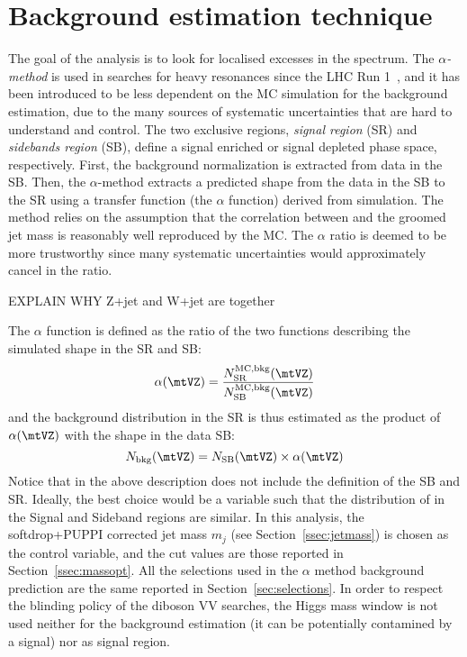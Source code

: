 \section{Background estimation technique}
\label{sec:alpha}

The goal of the analysis is to look for localised excesses in the \mtVZ spectrum. The \emph{$\alpha$-method} is used in searches for heavy resonances since the LHC Run 1~\cite{Khachatryan:2015cwa}, and it has been introduced to be less dependent on the MC simulation for the background \mtVZ estimation, due to the many sources of systematic uncertainties that are hard to understand and control. The two exclusive regions, \emph{signal region} (SR) and \emph{sidebands region} (SB), define a signal enriched or signal depleted phase space, respectively. First, the background normalization is extracted from data in the SB. Then, the $\alpha$-method extracts a predicted shape from the data in the SB to the SR using a transfer function (the $\alpha$ function) derived from simulation. The method relies on the assumption that the correlation between \mtVZ and the groomed jet mass is reasonably well reproduced by the MC. The $\alpha$ ratio is deemed to be more trustworthy since many systematic uncertainties would approximately cancel in the ratio.

{\color{red} EXPLAIN WHY Z+jet and W+jet are together}

\noindent The $\alpha$ function is defined as the ratio of the two functions describing the simulated \mtVZ shape in the SR and SB:
$$\alpha(\mtVZ) = \frac{N_{\text{SR}}^{\text{MC,bkg}}(\mtVZ)}{N_{\text{SB}}^{\text{MC,bkg}}(\mtVZ)}$$
%
and the background distribution in the SR is thus estimated as the product of  $\alpha(\mtVZ)$ with the shape in the data SB:
%
$$N_{\text{bkg}}(\mtVZ) = N_{\text{SB}}(\mtVZ) \times \alpha(\mtVZ)$$
%
Notice that in the above description does not include the definition of the SB and SR. Ideally, the best choice would be a variable such that the distribution of \mtVZ in the Signal and Sideband regions are similar. In this analysis, the softdrop+PUPPI corrected jet mass $m_j$ (see Section~\ref{ssec:jetmass}) is chosen as the control variable, and the cut values are those reported in Section~\ref{ssec:massopt}. All the selections used in the $\alpha$ method background prediction are the same reported in Section~\ref{sec:selections}.
In order to respect the blinding policy of the diboson VV searches, the Higgs mass window is not used neither for the background estimation (it can be potentially contamined by a signal) nor as signal region.

